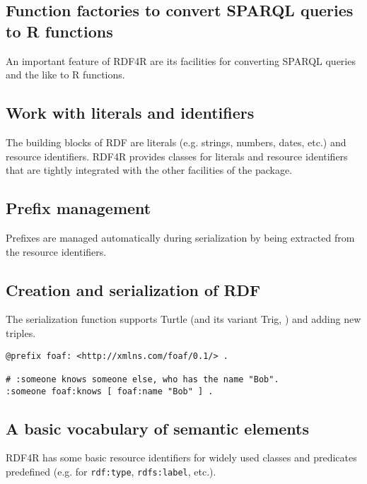 \subsection{Function factories to convert SPARQL queries to R functions}

An important feature of RDF4R are its facilities for converting SPARQL queries and the like to R functions.

\subsection{Work with literals and identifiers}

The building blocks of RDF are literals (e.g. strings, numbers, dates, etc.) and resource identifiers. RDF4R provides classes for literals and resource identifiers that are tightly integrated with the other facilities of the package.

\subsection{Prefix management}

Prefixes are managed automatically during serialization by being extracted from the resource identifiers.

\subsection{Creation and serialization of RDF}

The serialization function supports Turtle (and its variant Trig, \cite{bizer_rdf_2014}) and adding new triples.

\begin{lstlisting}[language=SPARQL,
caption=Using brackets to express RDF blank nodes in Turtle/TriG.,
label=fig:turtle-brackets,
basicstyle=\ttfamily\tiny]
@prefix foaf: <http://xmlns.com/foaf/0.1/> .

# :someone knows someone else, who has the name "Bob".
:someone foaf:knows [ foaf:name "Bob" ] .
\end{lstlisting}

\subsection{A basic vocabulary of semantic elements}

RDF4R has some basic resource identifiers for widely used classes and predicates predefined (e.g. for {\tt rdf:type}, {\tt rdfs:label}, etc.).

